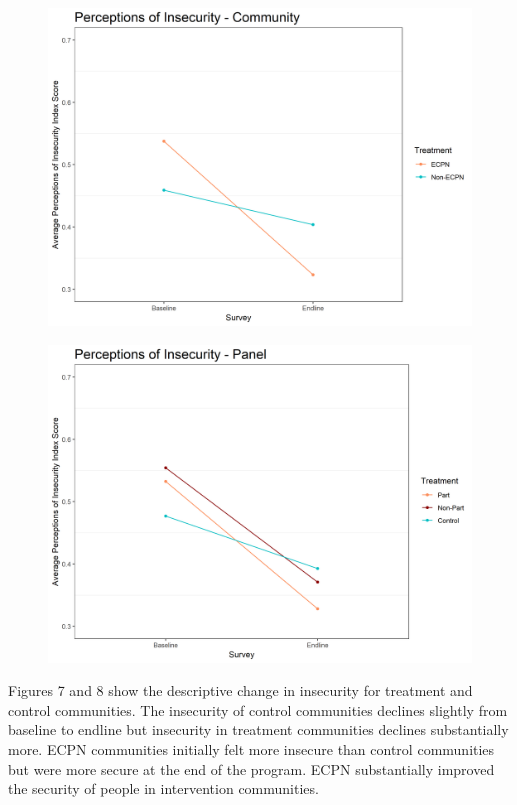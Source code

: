 \documentclass[11pt]{article}
\begin{document}
\begin{figure}[!h]
    \begin{minipage}[b]{.48\textwidth}
        \includegraphics[width=\linewidth]{../figs/inComm_plot.png}
        \label{fig:fig7}
    \end{minipage}
    \hfill
    \begin{minipage}[b]{.48\textwidth}
        \includegraphics[width=\linewidth]{../figs/inPan_plot.png}
        \label{fig:fig8}
    \end{minipage}
\end{figure}

Figures 7 and 8 show the descriptive change in insecurity for treatment
and control communities. The insecurity of control communities declines
slightly from baseline to endline but insecurity in treatment
communities declines substantially more. ECPN communities initially felt
more insecure than control communities but were more secure at the end
of the program. ECPN substantially improved the security of people in
intervention communities.
\end{document}
